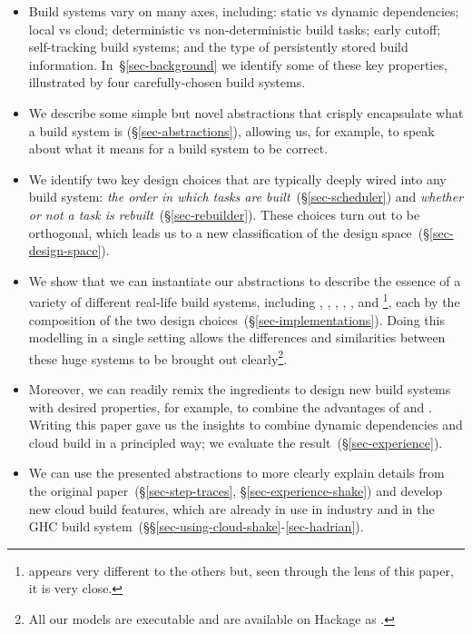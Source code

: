 \begin{itemize}
\item Build systems vary on many axes, including: static vs dynamic
  dependencies; local vs cloud; deterministic vs non-deterministic build tasks;
  early cutoff; self-tracking build systems; and the type of persistently stored
  build information. In~\S\ref{sec-background} we identify some of these key
  properties, illustrated by four carefully-chosen build systems.

\item We describe some simple but novel abstractions that
  crisply encapsulate what a build system is (\S\ref{sec-abstractions}),
  allowing us, for example, to speak about what it means for a build system to
  be correct.

\item We identify two key design choices that are typically deeply wired into
  any build system: \emph{the order in which tasks are
  built}~(\S\ref{sec-scheduler}) and \emph{whether or not a
  task is rebuilt}~(\S\ref{sec-rebuilder}). These choices turn out to
  be orthogonal, which leads us to a new classification of the design
  space~(\S\ref{sec-design-space}).

\item We show that we can instantiate our abstractions to describe the essence
of a variety of different real-life build systems, including \Make, \Shake,
\Bazel, \Buck, \Nix, and \Excel\footnote{\Excel appears very different to the
others but, seen through the lens of this paper, it is very close.}, each by the
composition of the two design choices~(\S\ref{sec-implementations}). Doing this
modelling in a single setting allows the differences and similarities between
these huge systems to be brought out clearly\footnote{All our models are
executable and are available on Hackage as .}.

\item Moreover, we can readily remix the ingredients to design new build systems
with desired properties, for example, to combine the advantages of \Shake and
\Bazel. Writing this paper gave us the insights to combine dynamic dependencies and
cloud build in a principled way; we evaluate the result~(\S\ref{sec-experience}).

\item We can use the presented abstractions to more clearly explain details from
the original \Shake paper~(\S\ref{sec-step-traces}, \S\ref{sec-experience-shake})
and develop new cloud build features, which are already in use in industry and in
the GHC build system~(\S\S\ref{sec-using-cloud-shake}-\ref{sec-hadrian}).

\end{itemize}

